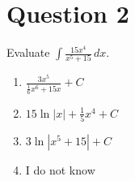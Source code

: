 
\section*{Question 2}
Evaluate $\int\frac{15x^4}{x^5+15}\,dx$.  
    
\begin{enumerate}[label = \alph*.]
    \item $\frac{3x^5}{\frac{1}{6}x^6+15x}+C$
    \item $15\ln|x|+\frac{1}{5}x^4+C$
    \item $3\ln|x^5+15|+C$
    \item I do not know
\end{enumerate}

\setcounter{solutionMainStep}{0}
\setcounter{solutionSubStep}{0}

